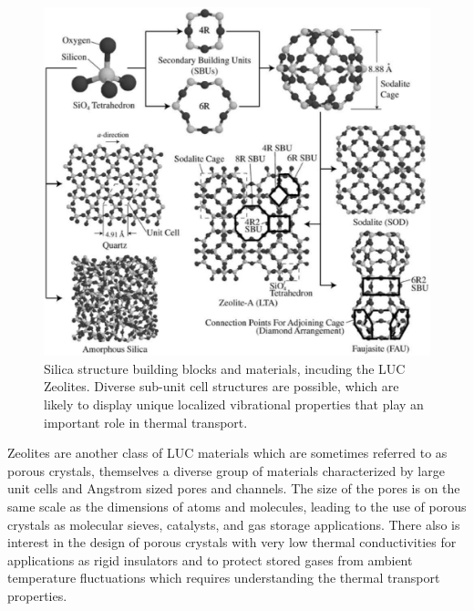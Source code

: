 \documentclass[letterpaper,12pt]{article}
\begin{document}
\begin{figure}
\begin{center}
\includegraphics[scale=0.25]{alan_silica_structures.eps}
\vspace*{-5mm}
\end{center}
\caption{\label{FIG:silica_structures} Silica structure building blocks and materials, incuding the LUC Zeolites. Diverse sub-unit cell structures are possible, which are likely to display unique localized vibrational properties that play an important role in thermal transport.}
\end{figure}

Zeolites are another class of LUC materials which are sometimes referred to as porous crystals, themselves a diverse group of materials
characterized by large unit cells and Angstrom sized pores
and channels.\cite{mcgaughey2004b} The size of the pores is on the same scale as the
dimensions of atoms and molecules, leading to the use of porous crystals as molecular sieves, catalysts, and gas storage applications.\cite{dyer1988} There also is interest in the design of porous crystals with very low thermal conductivities for applications as rigid insulators and to protect stored gases from ambient temperature fluctuations which requires understanding the thermal transport properties.
\end{document}
